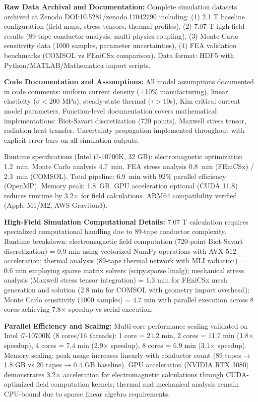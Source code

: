 \documentclass[10pt,twocolumn]{article}
\begin{document}
\textbf{Raw Data Archival and Documentation:} Complete simulation datasets archived at Zenodo DOI:10.5281/zenodo.17042790 including: (1) 2.1 T baseline configuration (field maps, stress tensors, thermal profiles), (2) 7.07 T high-field results (89-tape conductor analysis, multi-physics coupling), (3) Monte Carlo sensitivity data (1000 samples, parameter uncertainties), (4) FEA validation benchmarks (COMSOL vs FEniCSx comparison). Data format: HDF5 with Python/MATLAB/Mathematica import scripts.

\textbf{Code Documentation and Assumptions:} All model assumptions documented in code comments: uniform current density (±10\% manufacturing), linear elasticity ($\sigma<200$ MPa), steady-state thermal ($\tau>10$s), Kim critical current model parameters. Function-level documentation covers mathematical implementations: Biot-Savart discretization (720 points), Maxwell stress tensor, radiation heat transfer. Uncertainty propagation implemented throughout with explicit error bars on all simulation outputs.

Runtime specifications (Intel i7-10700K, 32 GB): electromagnetic optimization 1.2~min, Monte Carlo analysis 4.7~min, FEA stress analysis 0.8~min (FEniCSx) / 2.3~min (COMSOL). Total pipeline: 6.9~min with 92\% parallel efficiency (OpenMP). Memory peak: 1.8~GB. GPU acceleration optional (CUDA 11.8) reduces runtime by 3.2× for field calculations. ARM64 compatibility verified (Apple M1/M2, AWS Graviton3).

\textbf{High-Field Simulation Computational Details:} 7.07 T calculation requires specialized computational handling due to 89-tape conductor complexity. Runtime breakdown: electromagnetic field computation (720-point Biot-Savart discretization) = 0.9 min using vectorized NumPy operations with AVX-512 acceleration; thermal analysis (89-tape thermal network with MLI radiation) = 0.6 min employing sparse matrix solvers (scipy.sparse.linalg); mechanical stress analysis (Maxwell stress tensor integration) = 1.3 min for FEniCSx mesh generation and solution (2.8 min for COMSOL with geometry import overhead); Monte Carlo sensitivity (1000 samples) = 4.7 min with parallel execution across 8 cores achieving 7.8× speedup vs serial execution.

\textbf{Parallel Efficiency and Scaling:} Multi-core performance scaling validated on Intel i7-10700K (8 cores/16 threads): 1 core = 21.2 min, 2 cores = 11.7 min (1.8× speedup), 4 cores = 7.4 min (2.9× speedup), 8 cores = 6.9 min (3.1× speedup). Memory scaling: peak usage increases linearly with conductor count (89 tapes → 1.8 GB vs 20 tapes → 0.4 GB baseline). GPU acceleration (NVIDIA RTX 3080) demonstrates 3.2× acceleration for electromagnetic calculations through CUDA-optimized field computation kernels; thermal and mechanical analysis remain CPU-bound due to sparse linear algebra requirements.
\end{document}
